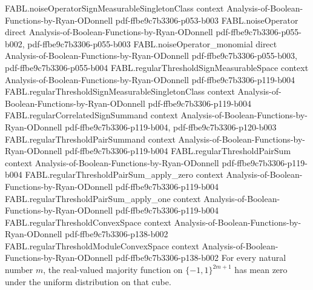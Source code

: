 \begin{theorem}
\proofstep
  {FABL.noiseOperatorSignMeasurableSingletonClass}
  {context}
  {Analysis-of-Boolean-Functions-by-Ryan-ODonnell}
  {pdf-ffbe9c7b3306-p053-b003}
\proofstep
  {FABL.noiseOperator}
  {direct}
  {Analysis-of-Boolean-Functions-by-Ryan-ODonnell}
  {pdf-ffbe9c7b3306-p055-b002,
    pdf-ffbe9c7b3306-p055-b003}
\proofstep
  {FABL.noiseOperator_monomial}
  {direct}
  {Analysis-of-Boolean-Functions-by-Ryan-ODonnell}
  {pdf-ffbe9c7b3306-p055-b003,
    pdf-ffbe9c7b3306-p055-b004}
\proofstep
  {FABL.regularThresholdSignMeasurableSpace}
  {context}
  {Analysis-of-Boolean-Functions-by-Ryan-ODonnell}
  {pdf-ffbe9c7b3306-p119-b004}
\proofstep
  {FABL.regularThresholdSignMeasurableSingletonClass}
  {context}
  {Analysis-of-Boolean-Functions-by-Ryan-ODonnell}
  {pdf-ffbe9c7b3306-p119-b004}
\proofstep
  {FABL.regularCorrelatedSignSummand}
  {context}
  {Analysis-of-Boolean-Functions-by-Ryan-ODonnell}
  {pdf-ffbe9c7b3306-p119-b004,
    pdf-ffbe9c7b3306-p120-b003}
\proofstep
  {FABL.regularThresholdPairSummand}
  {context}
  {Analysis-of-Boolean-Functions-by-Ryan-ODonnell}
  {pdf-ffbe9c7b3306-p119-b004}
\proofstep
  {FABL.regularThresholdPairSum}
  {context}
  {Analysis-of-Boolean-Functions-by-Ryan-ODonnell}
  {pdf-ffbe9c7b3306-p119-b004}
\proofstep
  {FABL.regularThresholdPairSum_apply_zero}
  {context}
  {Analysis-of-Boolean-Functions-by-Ryan-ODonnell}
  {pdf-ffbe9c7b3306-p119-b004}
\proofstep
  {FABL.regularThresholdPairSum_apply_one}
  {context}
  {Analysis-of-Boolean-Functions-by-Ryan-ODonnell}
  {pdf-ffbe9c7b3306-p119-b004}
\proofstep
  {FABL.regularThresholdConvexSpace}
  {context}
  {Analysis-of-Boolean-Functions-by-Ryan-ODonnell}
  {pdf-ffbe9c7b3306-p138-b002}
\proofstep
  {FABL.regularThresholdModuleConvexSpace}
  {context}
  {Analysis-of-Boolean-Functions-by-Ryan-ODonnell}
  {pdf-ffbe9c7b3306-p138-b002}
For every natural number $m$, the real-valued majority function on $\{-1,1\}^{2m+1}$ has
mean zero under the uniform distribution on that cube.
\end{theorem}

